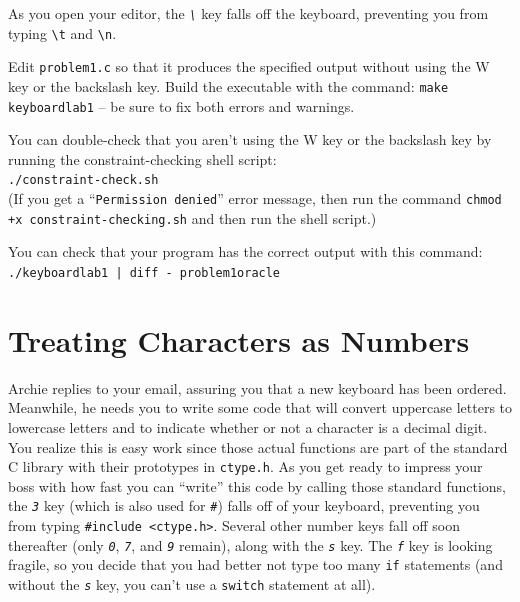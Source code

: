 As you open your editor, the \textit{\texttt{\textbackslash}} key falls off the
keyboard, preventing you from typing \texttt{\textbackslash t} and
\texttt{\textbackslash n}.

Edit \texttt{problem1.c} so that it produces the specified output without using
the W key or the backslash key. Build the executable with the command:
\texttt{make keyboardlab1} -- be sure to fix both errors and warnings.

You can double-check that you aren't using the W key or the backslash key by
running the constraint-checking shell script: \\
\texttt{./constraint-check.sh} \\
(If you get a ``\texttt{Permission denied}'' error message, then run the
command \texttt{chmod +x constraint-checking.sh} and then run the shell script.)

You can check that your program has the correct output with this command: \\
\texttt{./keyboardlab1 | diff - problem1oracle}


\section{Treating Characters as Numbers}

Archie replies to your email, assuring you that a new keyboard has been
ordered. Meanwhile, he needs you to write some code that will convert uppercase
letters to lowercase letters and to indicate whether or not a character is a
decimal digit. You realize this is easy work since those actual functions are
part of the standard C library with their prototypes in \texttt{ctype.h}. As
you get ready to impress your boss with how fast you can ``write'' this code by
calling those standard functions, the \textit{\texttt{3}} key (which is also
used for \textit{\texttt{\#}}) falls off of your keyboard, preventing you from
typing \lstinline{#include <ctype.h>}. Several other number keys fall off soon
thereafter (only \textit{\texttt{0}}, \textit{\texttt{7}}, and
\textit{\texttt{9}} remain), along with the \textit{\texttt{s}} key. The
\textit{\texttt{f}} key is looking fragile, so you decide that you had better
not type too many \lstinline{if} statements (and without the
\textit{\texttt{s}} key, you can't use a \lstinline{switch} statement at all).


